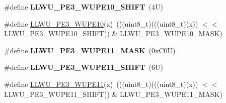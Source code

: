 \begin{DoxyCompactItemize}
\#define {\bfseries L\+L\+W\+U\+\_\+\+P\+E3\+\_\+\+W\+U\+P\+E10\+\_\+\+S\+H\+I\+FT}~(4\+U)
\item 
\#define \mbox{\hyperlink{group___l_l_w_u___register___masks_ga5ba778d142ba95753b9eec4e9c5e73f6}{L\+L\+W\+U\+\_\+\+P\+E3\+\_\+\+W\+U\+P\+E10}}(x)~(((uint8\+\_\+t)(((uint8\+\_\+t)(x)) $<$$<$ L\+L\+W\+U\+\_\+\+P\+E3\+\_\+\+W\+U\+P\+E10\+\_\+\+S\+H\+I\+FT)) \& L\+L\+W\+U\+\_\+\+P\+E3\+\_\+\+W\+U\+P\+E10\+\_\+\+M\+A\+SK)
\item 
\mbox{\label{group___l_l_w_u___register___masks_gad46cfb926e4e6bbc0cba079fb07a2bfd}} 
\#define {\bfseries L\+L\+W\+U\+\_\+\+P\+E3\+\_\+\+W\+U\+P\+E11\+\_\+\+M\+A\+SK}~(0x\+C0\+U)
\item 
\mbox{\label{group___l_l_w_u___register___masks_gad8a60b9eab4fe9a0c559bae94033ca1e}} 
\#define {\bfseries L\+L\+W\+U\+\_\+\+P\+E3\+\_\+\+W\+U\+P\+E11\+\_\+\+S\+H\+I\+FT}~(6\+U)
\item 
\#define \mbox{\hyperlink{group___l_l_w_u___register___masks_ga73485bbb713aeb9b283996279ffdea6c}{L\+L\+W\+U\+\_\+\+P\+E3\+\_\+\+W\+U\+P\+E11}}(x)~(((uint8\+\_\+t)(((uint8\+\_\+t)(x)) $<$$<$ L\+L\+W\+U\+\_\+\+P\+E3\+\_\+\+W\+U\+P\+E11\+\_\+\+S\+H\+I\+FT)) \& L\+L\+W\+U\+\_\+\+P\+E3\+\_\+\+W\+U\+P\+E11\+\_\+\+M\+A\+SK)
\end{DoxyCompactItemize}
